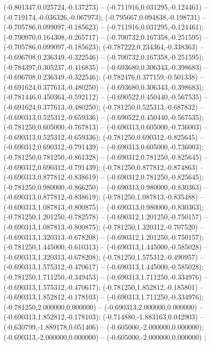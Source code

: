  (-0.801347,0.025724,-0.137273) -- (-0.711916,0.031295,-0.124461) -- (-0.719174,-0.036326,-0.067973);
 (-0.795667,0.094838,-0.198731) -- (-0.705786,0.099097,-0.185623) -- (-0.711916,0.031295,-0.124461);
 (-0.790970,0.164308,-0.265717) -- (-0.700732,0.167358,-0.251595) -- (-0.705786,0.099097,-0.185623);
 (-0.787222,0.234364,-0.338363) -- (-0.696708,0.236349,-0.322546) -- (-0.700732,0.167358,-0.251595);
 (-0.784397,0.305237,-0.416835) -- (-0.693680,0.306343,-0.398683) -- (-0.696708,0.236349,-0.322546);
 (-0.782476,0.377159,-0.501338) -- (-0.691624,0.377613,-0.480250) -- (-0.693680,0.306343,-0.398683);
 (-0.781446,0.450364,-0.592112) -- (-0.690522,0.450440,-0.567535) -- (-0.691624,0.377613,-0.480250);
 (-0.781250,0.525313,-0.687832) -- (-0.690313,0.525312,-0.659336) -- (-0.690522,0.450440,-0.567535);
 (-0.781250,0.605000,-0.767813) -- (-0.690313,0.605000,-0.736003) -- (-0.690313,0.525312,-0.659336);
 (-0.781250,0.690312,-0.825645) -- (-0.690312,0.690312,-0.791439) -- (-0.690313,0.605000,-0.736003);
 (-0.781250,0.781250,-0.861328) -- (-0.690312,0.781250,-0.825645) -- (-0.690312,0.690312,-0.791439);
 (-0.781250,0.877812,-0.874863) -- (-0.690313,0.877812,-0.838619) -- (-0.690312,0.781250,-0.825645);
 (-0.781250,0.980000,-0.866250) -- (-0.690313,0.980000,-0.830363) -- (-0.690313,0.877812,-0.838619);
 (-0.781250,1.087813,-0.835488) -- (-0.690313,1.087813,-0.800875) -- (-0.690313,0.980000,-0.830363);
 (-0.781250,1.201250,-0.782578) -- (-0.690312,1.201250,-0.750157) -- (-0.690313,1.087813,-0.800875);
 (-0.781250,1.320312,-0.707520) -- (-0.690313,1.320313,-0.678208) -- (-0.690312,1.201250,-0.750157);
 (-0.781250,1.445000,-0.610313) -- (-0.690313,1.445000,-0.585028) -- (-0.690313,1.320313,-0.678208);
 (-0.781250,1.575312,-0.490957) -- (-0.690313,1.575312,-0.470617) -- (-0.690313,1.445000,-0.585028);
 (-0.781250,1.711250,-0.349453) -- (-0.690313,1.711250,-0.334976) -- (-0.690313,1.575312,-0.470617);
 (-0.781250,1.852812,-0.185801) -- (-0.690313,1.852812,-0.178103) -- (-0.690313,1.711250,-0.334976);
 (-0.781250,2.000000,0.000000) -- (-0.690313,2.000000,0.000000) -- (-0.690313,1.852812,-0.178103);
 (-0.714880,-1.883163,0.042903) -- (-0.630799,-1.889178,0.051406) -- (-0.605000,-2.000000,0.000000);
 (-0.690313,-2.000000,0.000000) -- (-0.605000,-2.000000,0.000000) ;
